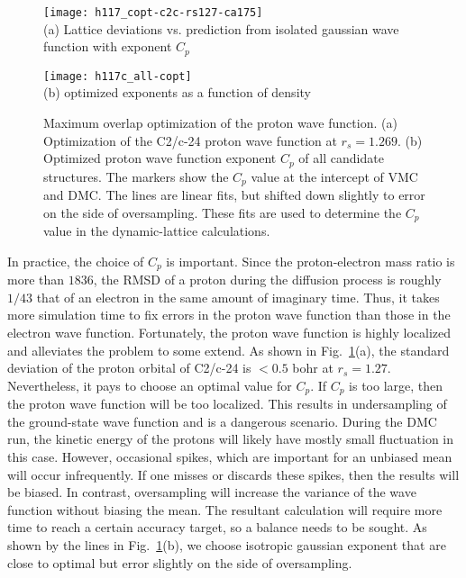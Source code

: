 \begin{figure}[h]
	\centering
	\begin{minipage}{0.49\textwidth}
		\centering
		\texttt{[image: h117\_copt-c2c-rs127-ca175]}\\
		(a) Lattice deviations vs. prediction from isolated gaussian wave function with exponent $C_p$
	\end{minipage}
	\begin{minipage}{0.49\textwidth}
		\centering
		\texttt{[image: h117c\_all-copt]}\\
		(b) optimized exponents as a function of density
	\end{minipage}
	\caption{Maximum overlap optimization of the proton wave function. (a) Optimization of the C2/c-24 proton wave function at $r_s=1.269$. (b) Optimized proton wave function exponent $C_p$ of all candidate structures. The markers show the $C_p$ value at the intercept of VMC and DMC. The lines are linear fits, but shifted down slightly to error on the side of oversampling. These fits are used to determine the $C_p$ value in the dynamic-lattice calculations.}
	\label{fig:hsolid-cp-opt}
\end{figure}

In practice, the choice of $C_p$ is important.
Since the proton-electron mass ratio is more than $1836$, the RMSD of a proton during the diffusion process is roughly $1/43$ that of an electron in the same amount of imaginary time.
Thus, it takes more simulation time to fix errors in the proton wave function than those in the electron wave function.
Fortunately, the proton wave function is highly localized and alleviates the problem to some extend.
As shown in Fig.~\ref{fig:hsolid-cp-opt}(a), the standard deviation of the proton orbital of C2/c-24 is $<0.5$ bohr at $r_s=1.27$.
Nevertheless, it pays to choose an optimal value for $C_p$.
If $C_p$ is too large, then the proton wave function will be too localized.
This results in undersampling of the ground-state wave function and is a dangerous scenario.
During the DMC run, the kinetic energy of the protons will likely have mostly small fluctuation in this case.
However, occasional spikes, which are important for an unbiased mean will occur infrequently.
If one misses or discards these spikes, then the results will be biased.
In contrast, oversampling will increase the variance of the wave function without biasing the mean.
The resultant calculation will require more time to reach a certain accuracy target, so a balance needs to be sought.
As shown by the lines in Fig.~\ref{fig:hsolid-cp-opt}(b), we choose isotropic gaussian exponent that are close to optimal but error slightly on the side of oversampling.

